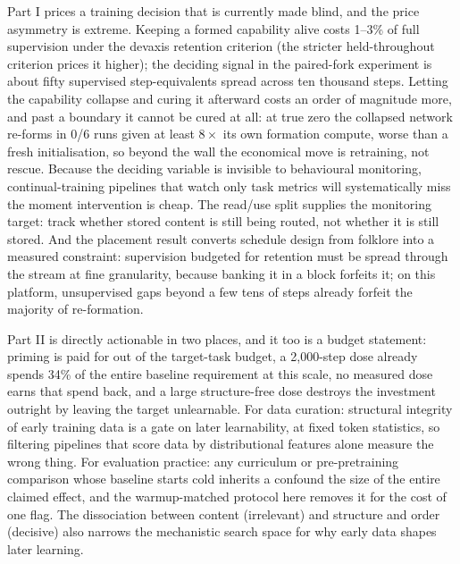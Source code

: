 \documentclass{article}
\begin{document}
Part I prices a training decision that is currently made blind, and the price asymmetry is
extreme. Keeping a formed capability
alive costs 1--3\% of full supervision under the devaxis retention criterion (the stricter
held-throughout criterion prices it higher); the deciding signal in the paired-fork experiment
is about fifty supervised step-equivalents spread across ten thousand steps. Letting the
capability collapse and curing it afterward costs an
order of magnitude more, and past a boundary it cannot be cured at all: at true zero the
collapsed network re-forms in 0/6 runs given at least $8\times$ its own formation compute,
worse than a fresh initialisation, so beyond the wall the economical move is retraining, not
rescue. Because the deciding
variable is invisible to behavioural monitoring, continual-training pipelines that watch
only task metrics will systematically miss the moment intervention is cheap. The read/use
split supplies the monitoring target: track whether stored content is still being routed,
not whether it is still stored. And the placement result converts schedule design from
folklore into a measured constraint: supervision budgeted for retention must be spread
through the stream at fine granularity, because banking it in a block forfeits it; on this
platform, unsupervised gaps beyond a few tens of steps already forfeit the majority of
re-formation.

Part II is directly actionable in two places, and it too is a budget statement: priming is
paid for out of the target-task budget, a 2{,}000-step dose already spends 34\% of the entire
baseline requirement at this scale, no measured dose earns that spend back, and a large
structure-free dose destroys the investment outright by leaving the target unlearnable. For
data curation: structural integrity of
early training data is a gate on later learnability, at fixed token statistics, so filtering
pipelines that score data by distributional features alone measure the wrong thing. For
evaluation practice: any curriculum or pre-pretraining comparison whose baseline starts cold
inherits a confound the size of the entire claimed effect, and the warmup-matched protocol
here removes it for the cost of one flag. The dissociation between content (irrelevant) and
structure and order (decisive) also narrows the mechanistic search space for why early data
shapes later learning.
\end{document}
